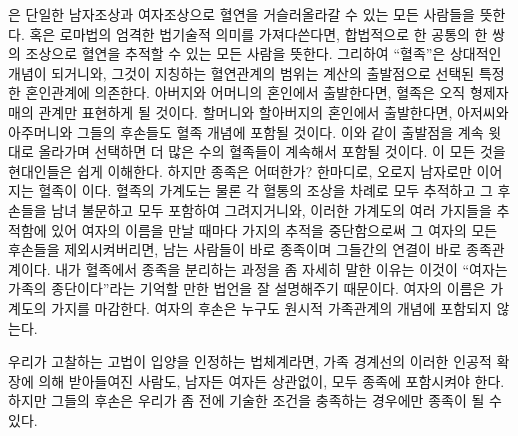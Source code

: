 은 단일한 남자조상과 여자조상으로 혈연을 거슬러올라갈 수 있는
모든 사람들을 뜻한다.
혹은 로마법의 엄격한 법기술적 의미를 가져다쓴다면,
합법적으로 한 공통의 한 쌍의 조상으로
혈연을 추적할 수 있는 모든 사람을 뜻한다.
그리하여 ``혈족''은 상대적인 개념이 되거니와,
그것이 지칭하는 혈연관계의 범위는 계산의 출발점으로 선택된
특정한 혼인관계에 의존한다.
아버지와 어머니의 혼인에서 출발한다면, 혈족은 오직
형제자매의 관계만 표현하게 될 것이다.
할머니와 할아버지의 혼인에서 출발한다면, 아저씨와 아주머니와 그들의 후손들도
혈족 개념에 포함될 것이다.
이와 같이 출발점을 계속 윗대로 올라가며 선택하면 더 많은 수의 혈족들이
계속해서 포함될 것이다.
이 모든 것을 현대인들은 쉽게 이해한다.
하지만 종족은 어떠한가?
한마디로, 오로지 남자로만 이어지는 혈족이 이다.
혈족의 가계도는 물론 각 혈통의 조상을 차례로 모두 추적하고
그 후손들을 남녀 불문하고 모두 포함하여 그려지거니와,
이러한 가계도의 여러 가지들을 추적함에 있어
여자의 이름을 만날 때마다 가지의 추적을 중단함으로써
그 여자의 모든 후손들을 제외시켜버리면,
남는 사람들이 바로 종족이며 그들간의 연결이 바로 종족관계이다.
내가 혈족에서 종족을 분리하는 과정을 좀 자세히 말한 이유는 이것이
``여자는 가족의 종단이다''라는
기억할 만한 법언을 잘 설명해주기 때문이다.
여자의 이름은 가계도의 가지를 마감한다.
여자의 후손은 누구도 원시적 가족관계의 개념에 포함되지 않는다.

우리가 고찰하는 고법이 입양을 인정하는 법체계라면,
가족 경계선의 이러한 인공적 확장에 의해 받아들여진 사람도,
남자든 여자든 상관없이, 모두 종족에 포함시켜야 한다.
하지만 그들의 후손은 우리가 좀 전에 기술한 조건을 충족하는 경우에만
종족이 될 수 있다.

